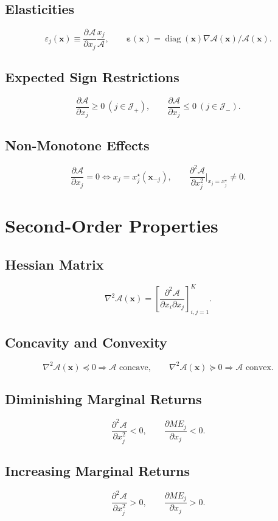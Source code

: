 \documentclass[11pt]{article}
\begin{document}
\subsection{Elasticities}
\[
\varepsilon_j(\bm{x})\equiv\frac{\partial\mathcal{A}}{\partial x_j}\frac{x_j}{\mathcal{A}},
\qquad \bm{\varepsilon}(\bm{x})=\operatorname{diag}(\bm{x})\nabla\mathcal{A}(\bm{x})/\mathcal{A}(\bm{x}).
\]

\subsection{Expected Sign Restrictions}
\[
\frac{\partial \mathcal{A}}{\partial x_j}\ge 0\ (j\in\mathcal{J}_+),
\qquad \frac{\partial \mathcal{A}}{\partial x_j}\le 0\ (j\in\mathcal{J}_-).
\]

\subsection{Non-Monotone Effects}
\[
\frac{\partial \mathcal{A}}{\partial x_j}=0 \iff x_j=x_j^{\star}(\bm{x}_{-j}),
\qquad \frac{\partial^2 \mathcal{A}}{\partial x_j^2}\bigg|_{x_j=x_j^{\star}}\neq 0.
\]

\section{Second-Order Properties}

\subsection{Hessian Matrix}
\[
\nabla^2\mathcal{A}(\bm{x})=\left[\frac{\partial^2\mathcal{A}}{\partial x_i\partial x_j}\right]_{i,j=1}^K.
\]

\subsection{Concavity and Convexity}
\[
\nabla^2\mathcal{A}(\bm{x})\preceq 0 \Rightarrow \mathcal{A}\text{ concave},
\qquad
\nabla^2\mathcal{A}(\bm{x})\succeq 0 \Rightarrow \mathcal{A}\text{ convex}.
\]

\subsection{Diminishing Marginal Returns}
\[
\frac{\partial^2\mathcal{A}}{\partial x_j^2}<0,
\qquad \frac{\partial ME_j}{\partial x_j}<0.
\]

\subsection{Increasing Marginal Returns}
\[
\frac{\partial^2\mathcal{A}}{\partial x_j^2}>0,
\qquad \frac{\partial ME_j}{\partial x_j}>0.
\]
\end{document}
